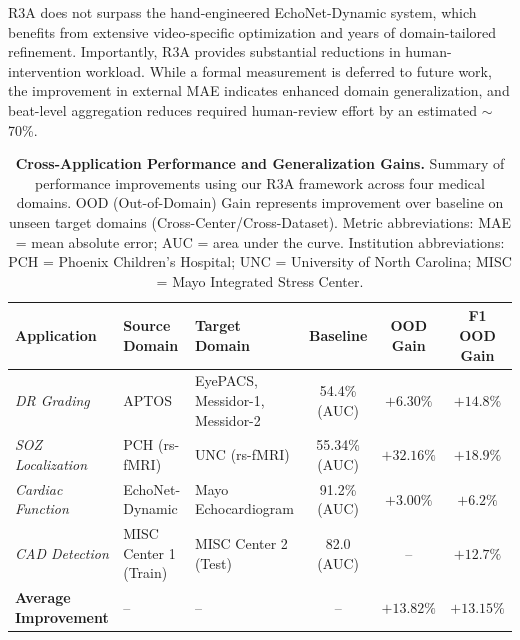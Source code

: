 \documentclass{article}
\begin{document}
R3A does not surpass the hand-engineered EchoNet-Dynamic system, which
benefits from extensive video-specific optimization and years of
domain-tailored refinement. Importantly, R3A provides substantial
reductions in human-intervention workload. While a formal measurement is
deferred to future work, the improvement in external MAE indicates
enhanced domain generalization, and beat-level aggregation reduces
required human-review effort by an estimated $\sim$70\%.
\begin{table}[h]
\centering
\scriptsize
\setlength{\tabcolsep}{4pt}
\renewcommand{\arraystretch}{1.25}
\caption{\footnotesize \textbf{Cross-Application Performance and Generalization Gains.}
Summary of performance improvements using our R3A framework across four medical domains.
OOD (Out-of-Domain) Gain represents improvement over baseline on unseen target domains (Cross-Center/Cross-Dataset).
Metric abbreviations: MAE = mean absolute error; AUC = area under the curve.
Institution abbreviations: PCH = Phoenix Children's Hospital; UNC = University of North Carolina;
MISC = Mayo Integrated Stress Center.}
\label{tab:cross_app_summary}
\begin{tabular}{lp{2.8cm}p{3.3cm}ccc}
\toprule
\textbf{Application} & \textbf{Source Domain} & \textbf{Target Domain} & \textbf{Baseline} & \textbf{OOD Gain} & \textbf{F1 OOD Gain} \\
\midrule
\textit{DR Grading}        & APTOS                 & EyePACS, Messidor-1, Messidor-2 & 54.4\% (AUC)   & $+6.30\%$  & $+14.8\%$ \\
\textit{SOZ Localization}  & PCH (rs-fMRI)         & UNC (rs-fMRI)                   & 55.34\% (AUC)  & $+32.16\%$ & $+18.9\%$ \\
\textit{Cardiac Function}  & EchoNet-Dynamic       & Mayo Echocardiogram             & 91.2\% (AUC)     & $+3.00\%$  & $+6.2\%$  \\
\textit{CAD Detection}     & MISC Center 1 (Train) & MISC Center 2 (Test)            & 82.0 (AUC)     & --         & $+12.7\%$ \\
\midrule
\rowcolor[gray]{0.95}
\textbf{Average Improvement} & -- & -- & -- & $+13.82\%$ & $+13.15\%$ \\
\bottomrule
\end{tabular}
\end{table}
\end{document}

